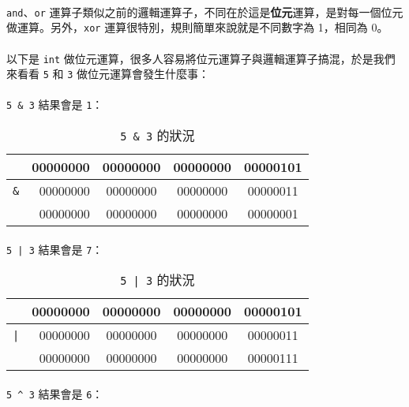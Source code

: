 \documentclass[12pt,a4paper,oneside]{article}
\begin{document}
\begin{CJK}{UTF8}{bkai}
\paragraph{}\texttt{and}、\texttt{or} 運算子類似之前的邏輯運算子，不同在於這是\textbf{位元}運算，是對每一個位元做運算。另外，\texttt{xor} 運算很特別，規則簡單來說就是不同數字為 1，相同為 0。
\paragraph{}以下是 \lstinline!int! 做位元運算，很多人容易將位元運算子與邏輯運算子搞混，於是我們來看看 \lstinline!5! 和 \lstinline!3! 做位元運算會發生什麼事：
\paragraph{}\lstinline!5 & 3! 結果會是 \lstinline!1!：

\begin{table}[h!]
\centering
\begin{tabular}{|c|r|c|c|c|}
\hline
 & 00000000 & 00000000 & 00000000 & 00000{\color{red}101}\\
\hline
\lstinline!&! & 00000000 & 00000000 & 00000000 & 00000{\color{red}011}\\
\hline\hline
 & 00000000 & 00000000 & 00000000 & 00000{\color{red}001}\\
\hline
\end{tabular}
\caption{\lstinline!5 & 3! 的狀況}
\label{basic:cpp:table:5:and:3}
\end{table}

\paragraph{}\lstinline!5 | 3! 結果會是 \lstinline!7!：

\begin{table}[h!]
\centering
\begin{tabular}{|c|r|c|c|c|}
\hline
 & 00000000 & 00000000 & 00000000 & 00000{\color{red}101}\\
\hline
\lstinline!|! & 00000000 & 00000000 & 00000000 & 00000{\color{red}011}\\
\hline\hline
 & 00000000 & 00000000 & 00000000 & 00000{\color{red}111}\\
\hline
\end{tabular}
\caption{\lstinline!5 | 3! 的狀況}
\label{basic:cpp:table:5:or:3}
\end{table}

\paragraph{}\lstinline!5 ^ 3! 結果會是 \lstinline!6!：


\end{CJK}
\end{document}
